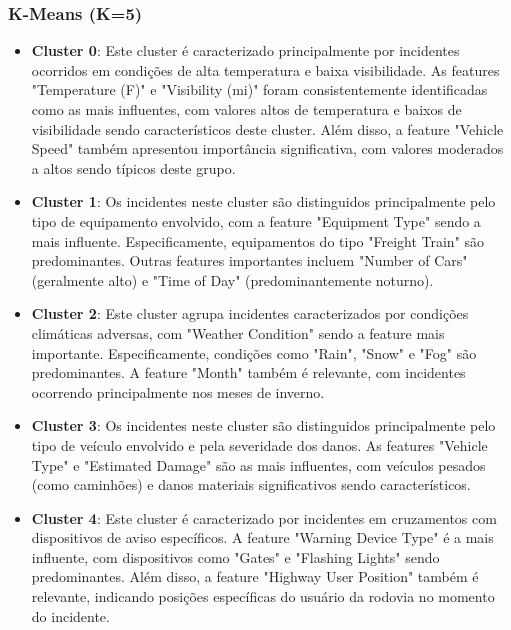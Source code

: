 \documentclass[conference]{IEEEtran}
\begin{document}
\subsubsection{K-Means (K=5)}
\begin{itemize}
    \item \textbf{Cluster 0}: Este cluster é caracterizado principalmente por incidentes ocorridos em condições de alta temperatura e baixa visibilidade. As features "Temperature (F)" e "Visibility (mi)" foram consistentemente identificadas como as mais influentes, com valores altos de temperatura e baixos de visibilidade sendo característicos deste cluster. Além disso, a feature "Vehicle Speed" também apresentou importância significativa, com valores moderados a altos sendo típicos deste grupo.
    
    \item \textbf{Cluster 1}: Os incidentes neste cluster são distinguidos principalmente pelo tipo de equipamento envolvido, com a feature "Equipment Type" sendo a mais influente. Especificamente, equipamentos do tipo "Freight Train" são predominantes. Outras features importantes incluem "Number of Cars" (geralmente alto) e "Time of Day" (predominantemente noturno).
    
    \item \textbf{Cluster 2}: Este cluster agrupa incidentes caracterizados por condições climáticas adversas, com "Weather Condition" sendo a feature mais importante. Especificamente, condições como "Rain", "Snow" e "Fog" são predominantes. A feature "Month" também é relevante, com incidentes ocorrendo principalmente nos meses de inverno.
    
    \item \textbf{Cluster 3}: Os incidentes neste cluster são distinguidos principalmente pelo tipo de veículo envolvido e pela severidade dos danos. As features "Vehicle Type" e "Estimated Damage" são as mais influentes, com veículos pesados (como caminhões) e danos materiais significativos sendo característicos.
    
    \item \textbf{Cluster 4}: Este cluster é caracterizado por incidentes em cruzamentos com dispositivos de aviso específicos. A feature "Warning Device Type" é a mais influente, com dispositivos como "Gates" e "Flashing Lights" sendo predominantes. Além disso, a feature "Highway User Position" também é relevante, indicando posições específicas do usuário da rodovia no momento do incidente.
\end{itemize}
\end{document}
